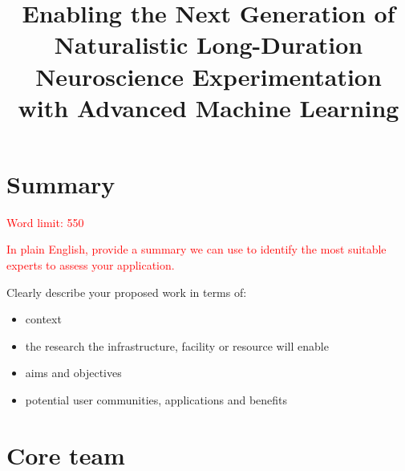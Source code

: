 \documentclass[12in]{article}
\title{Enabling the Next Generation of Naturalistic Long-Duration Neuroscience
Experimentation with Advanced Machine Learning}
\begin{document}
\tableofcontents

\pagebreak

\maketitle

\section{Summary}

\textcolor{red}{Word limit: 550}

\textcolor{red}{In plain English, provide a summary we can use to identify the
most suitable experts to assess your application.}

{\color{red}

Clearly describe your proposed work in terms of:

\begin{itemize}
\item context
\item the research the infrastructure, facility or resource will enable
\item aims and objectives
\item potential user communities, applications and benefits
\end{itemize}
}



\pagebreak

\section{Core team}
\end{document}
